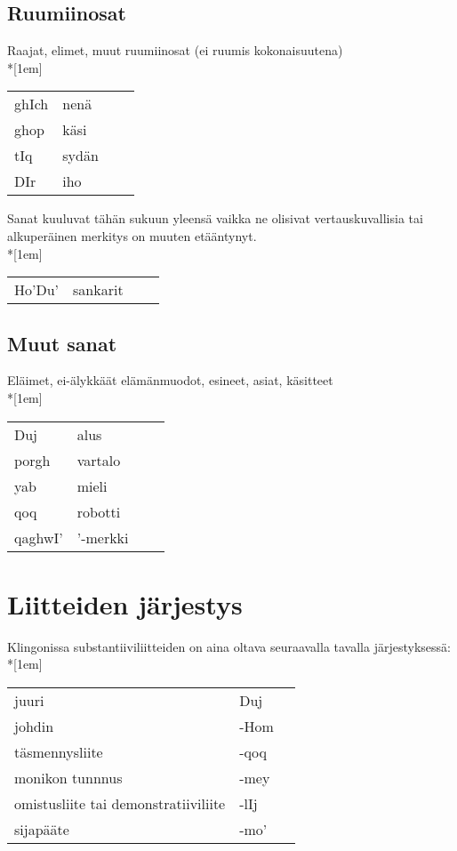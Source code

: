 \documentclass{book}
\begin{document}
\subsection{Ruumiinosat}

Raajat, elimet, muut ruumiinosat (ei ruumis kokonaisuutena)\\*[1em]
\begin{tabular}{Bl Il}
ghIch & nenä \\
ghop & käsi \\
tIq & sydän \\
DIr & iho \\
\end{tabular}

Sanat kuuluvat tähän sukuun yleensä vaikka ne olisivat vertauskuvallisia tai alkuperäinen merkitys on muuten etääntynyt.\\*[1em]
\begin{tabular}{Bl Il}
    Ho'Du' & sankarit \\
\end{tabular}

\subsection{Muut sanat}

Eläimet, ei-älykkäät elämänmuodot, esineet, asiat, käsitteet\\*[1em]
\begin{tabular}{Bl Il}
Duj & alus \\
porgh & vartalo \\
yab & mieli \\
qoq & robotti \\
qaghwI' & '-merkki \\
\end{tabular}

\section{Liitteiden järjestys}

Klingonissa substantiiviliitteiden on aina oltava seuraavalla tavalla järjestyksessä:\\*[1em]
\begin{tabular}{l Bl}
juuri & Duj \\
johdin & -Hom \\
täsmennysliite & -qoq \\
monikon tunnnus & -mey \\
omistusliite tai demonstratiiviliite & -lIj \\
sijapääte & -mo' \\
\end{tabular}
\end{document}
